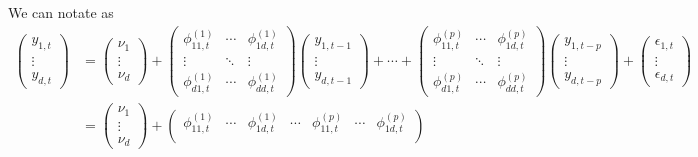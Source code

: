 \documentclass[fleqn]{article}
\begin{document}
We can notate as
\begin{align*}
    \begin{pmatrix}
        y_{1, t} \\
        \vdots \\
        y_{d, t}
    \end{pmatrix}
    &=
    \begin{pmatrix}
        \nu_1 \\
        \vdots \\
        \nu_d
    \end{pmatrix}
    +
    \begin{pmatrix}
        \phi^{(1)}_{11, t} & \cdots & \phi^{(1)}_{1d, t} \\
        \vdots & \ddots & \vdots \\
        \phi^{(1)}_{d1, t} & \cdots & \phi^{(1)}_{dd, t}
    \end{pmatrix}
    \begin{pmatrix}
        y_{1, t-1} \\
        \vdots \\
        y_{d, t-1}
    \end{pmatrix}
    + \cdots +
    \begin{pmatrix}
        \phi^{(p)}_{11, t} & \cdots & \phi^{(p)}_{1d, t} \\
        \vdots & \ddots & \vdots \\
        \phi^{(p)}_{d1, t} & \cdots & \phi^{(p)}_{dd, t}
    \end{pmatrix}
    \begin{pmatrix}
        y_{1, t-p} \\
        \vdots \\
        y_{d, t-p}
    \end{pmatrix}
    +
    \begin{pmatrix}
        \epsilon_{1, t} \\
        \vdots \\
        \epsilon_{d, t}
    \end{pmatrix} \\
    & =
    \begin{pmatrix}
        \nu_1 \\
        \vdots \\
        \nu_d
    \end{pmatrix}
    +
    \begin{pmatrix}
        \phi^{(1)}_{11, t} & \cdots & \phi^{(1)}_{1d, t}
        & \cdots &
        \phi^{(p)}_{11, t} & \cdots & \phi^{(p)}_{1d, t} \\

\end{pmatrix}
\end{align*}
\end{document}
